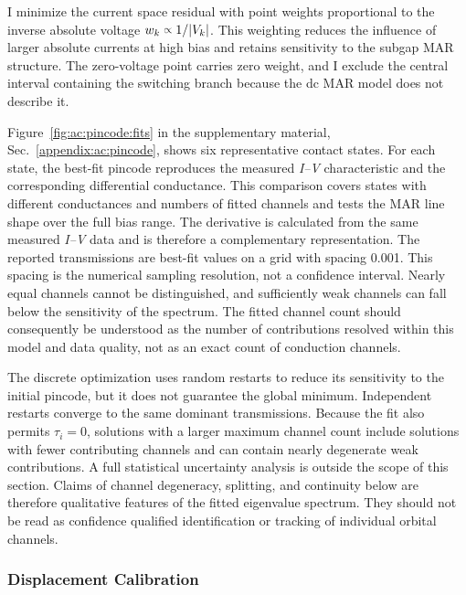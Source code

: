         I minimize the current space residual with point weights proportional to the inverse absolute voltage $w_k\spropto1/|V_k|$. This weighting reduces the influence of larger absolute currents at high bias and retains sensitivity to the subgap MAR structure. The zero-voltage point carries zero weight, and I exclude the central interval containing the switching branch because the dc MAR model does not describe it.

        Figure~\ref{fig:ac:pincode:fits} in the supplementary material, Sec.~\ref{appendix:ac:pincode}, shows six representative contact states. For each state, the best-fit pincode reproduces the measured \textit{I--V} characteristic and the corresponding differential conductance. This comparison covers states with different conductances and numbers of fitted channels and tests the MAR line shape over the full bias range. The derivative is calculated from the same measured \textit{I--V} data and is therefore a complementary representation. The reported transmissions are best-fit values on a grid with spacing 0.001. This spacing is the numerical sampling resolution, not a confidence interval. Nearly equal channels cannot be distinguished, and sufficiently weak channels can fall below the sensitivity of the spectrum. The fitted channel count should consequently be understood as the number of contributions resolved within this model and data quality, not as an exact count of conduction channels.

        The discrete optimization uses random restarts to reduce its sensitivity to the initial pincode, but it does not guarantee the global minimum. Independent restarts converge to the same dominant transmissions. Because the fit also permits $\tau_i=0$, solutions with a larger maximum channel count include solutions with fewer contributing channels and can contain nearly degenerate weak contributions. A full statistical uncertainty analysis is outside the scope of this section. Claims of channel degeneracy, splitting, and continuity below are therefore qualitative features of the fitted eigenvalue spectrum. They should not be read as confidence qualified identification or tracking of individual orbital channels.

    \subsubsection*{Displacement Calibration}

